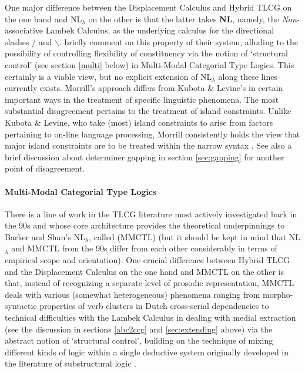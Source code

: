 \documentclass[output=paper]{langsci/langscibook}
\begin{document}
One major difference between the Displacement Calculus and Hybrid TLCG
on the one hand and NL\ensuremath{_\lambda} on the other is that the latter takes \textbf{NL},
namely, the \emph{Non}-associative Lambek Calculus, as the underlying
calculus for the directional slashes \ensuremath{/} and \ensuremath{\backslash}. \citet{barkershan2015}
briefly comment on this property of their system, alluding to the
possibility of controlling flexibility of constituency via the notion
of `structural control' (see section \ref{multi} below) in Multi-Modal
Categorial Type Logics. This certainly is a viable view, but no explicit
extension of NL\ensuremath{_\lambda} along these lines currently exists.
Morrill's approach differs from Kubota \& Levine's in certain important ways in the
treatment of specific linguistic phenomena. The most substantial
disagreement pertains to the treatment of island constraints. Unlike
Kubota \& Levine,  who take (most) island constraints to arise from
factors pertaining to on-line language processing, 
Morrill consistently holds the view that major island constraints
are to be treated within the narrow syntax
\citep{Morrill94a-u,morrill2011,morrilllp}. See also a brief
discussion about determiner gapping in section \ref{sec:gapping}
for another point of disagreement.


\paragraph{Multi-Modal Categorial Type Logics\label{multi}}

There is a line of work in the TLCG literature most actively investigated back in
the 90s and whose core architecture provides the theoretical
underpinnings to Barker and Shan's NL\ensuremath{_\lambda}, called
 (MMCTL)
\citep{moortgatoehrle94,Moortgat2011a-u,bernardiphd,vermaat05} (but it
should be kept in mind that NL\ensuremath{_\lambda} and MMCTL from the
90s differ from each other considerably in terms of  
empirical scope and orientation).
One crucial difference between Hybrid TLCG and the Displacement 
Calculus on the one hand and MMCTL on the other is that, instead of
recognizing a separate level of prosodic representation, MMCTL deals
with various (somewhat heterogeneous) phenomena ranging from
morpho-syntactic properties of verb clusters in Dutch cross-serial
dependencies \citep{moortgatoehrle94}  to technical difficulties
with the Lambek Calculus in dealing with medial extraction
\citep{bernardiphd,Moortgat2011a-u}  (see the discussion in sections 
\ref{abc2ccg} and \ref{sec:extending} above)
via the abstract notion of `structural control', building on the
technique of mixing different kinds of logic within  a single
deductive system originally developed in the literature of
substructural logic \citep{restall2000}. 
\end{document}

